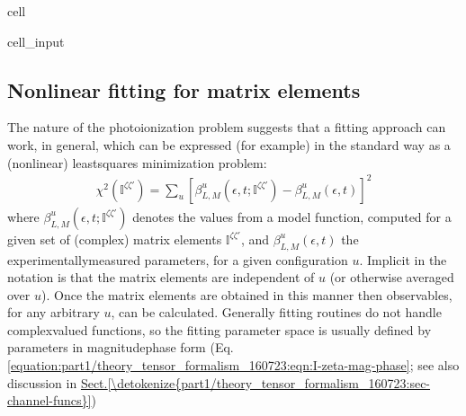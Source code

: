 \documentclass[letterpaper,table,10pt,english]{jupyterBook}
\begin{document}
\begin{sphinxuseclass}{cell}\begin{sphinxVerbatimInput}

\begin{sphinxuseclass}{cell_input}
\begin{sphinxVerbatim}[commandchars=\\\{\}]
\end{sphinxVerbatim}

\end{sphinxuseclass}\end{sphinxVerbatimInput}

\end{sphinxuseclass}

\subsection{Non\sphinxhyphen{}linear fitting for matrix elements}
\label{\detokenize{part1/numerics_070723:non-linear-fitting-for-matrix-elements}}
\sphinxAtStartPar
The nature of the photoionization problem suggests that a fitting approach can work, in general, which can be expressed (for example) in the standard way as a (non\sphinxhyphen{}linear) least\sphinxhyphen{}squares minimization problem:
\begin{equation}\label{equation:part1/numerics_070723:eq:chi2-I}
\begin{split}
\chi^{2}(\mathbb{I}^{\zeta\zeta'})=\sum_{u}\left[\beta^{u}_{L,M}(\epsilon,t;\mathbb{I}^{\zeta\zeta'})-\beta^{u}_{L,M}(\epsilon,t)\right]^{2}
\end{split}
\end{equation}
\sphinxAtStartPar
where \(\beta^{u}_{L,M}(\epsilon,t;\mathbb{I}^{\zeta\zeta'})\) denotes  the values from a model function, computed for a given set of (complex) matrix elements \(\mathbb{I}^{\zeta\zeta'}\), and \(\beta^{u}_{L,M}(\epsilon,t)\) the experimentally\sphinxhyphen{}measured parameters, for a given configuration \(u\). Implicit in the notation is that the matrix elements are independent of \(u\) (or otherwise averaged over \(u\)). Once the matrix elements are obtained in this manner then {\hyperref[\detokenize{backmatter/glossary:term-MF}]{}} observables, for any arbitrary \(u\), can be calculated. Generally fitting routines do not handle complex\sphinxhyphen{}valued functions, so the fitting parameter space is usually defined by parameters in magnitude\sphinxhyphen{}phase form (Eq. \eqref{equation:part1/theory_tensor_formalism_160723:eqn:I-zeta-mag-phase}; see also discussion in \hyperref[\detokenize{part1/theory_tensor_formalism_160723:sec-channel-funcs}]{Sect.\@ \ref{\detokenize{part1/theory_tensor_formalism_160723:sec-channel-funcs}}})
\end{document}
